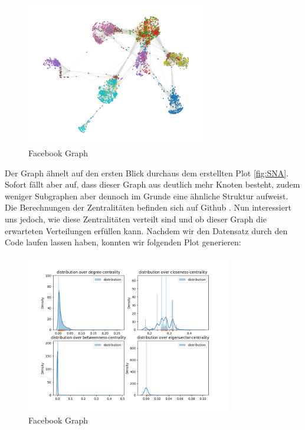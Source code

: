 \FloatBarrier
\begin{figure}[h!]%
  \centering
 \includegraphics[width=0.7\textwidth]{Graphics/FacebookPoliticalPlot.png}
  \caption{Facebook Graph}
  \label{fig:FacebookGraph}
\end{figure}
\FloatBarrier



Der Graph ähnelt auf den ersten Blick durchaus dem erstellten Plot \ref{fig:SNA}. Sofort fällt aber auf, dass dieser Graph aus deutlich mehr Knoten besteht, zudem weniger Subgraphen aber dennoch im Grunde eine ähnliche Struktur aufweist. Die Berechnungen der Zentralitäten befinden sich auf Github \cite{TZ}. Nun interessiert uns jedoch, wie diese Zentralitäten verteilt sind und ob dieser Graph die erwarteten Verteilungen erfüllen kann. Nachdem wir den Datensatz durch den Code laufen lassen haben, konnten wir folgenden Plot generieren:

\FloatBarrier
\begin{figure}[h!]%
  \centering
\includegraphics[width=0.8\textwidth]{Graphics/FacebookDistribution.png}
  \caption{Facebook Graph}
  \label{fig:FacebookGraphDistribution}
\end{figure}
\FloatBarrier

